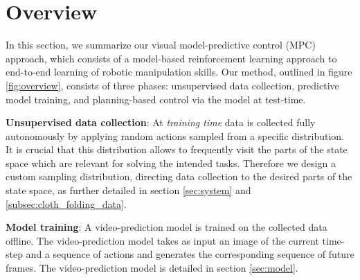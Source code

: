 \section{Overview}\label{sec:prelim}
\label{sec:vmpc}

In this section, we summarize our visual model-predictive control (MPC) approach, which consists of a model-based reinforcement learning approach to end-to-end learning of robotic manipulation skills. Our method, outlined in figure \ref{fig:overview}, consists of three phases: unsupervised data collection, predictive model training, and planning-based control via the model at test-time.

\textbf{Unsupervised data collection}: At \emph{training time} data is collected fully autonomously by applying random actions sampled from a specific distribution. It is crucial that this distribution allows to frequently visit the parts of the state space which are relevant for solving the intended tasks. Therefore we design a custom sampling distribution, directing data collection to the desired parts of the state space, as further detailed in section \ref{sec:system} and \ref{subsec:cloth_folding_data}.

\textbf{Model training}: A video-prediction model is trained on the collected data offline. The video-prediction model takes as input an image of the current time-step and a sequence of actions and generates the corresponding sequence of future frames. The video-prediction model is detailed in section \ref{sec:model}.

